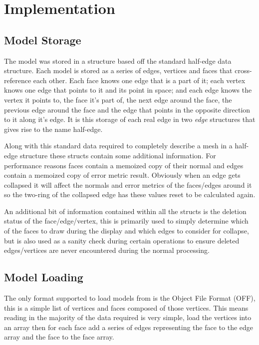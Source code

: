 \chapter{Implementation}

  \vspace{-10pt}
  \section{Model Storage}

    The model was stored in a structure based off the standard half-edge data
    structure.  Each model is stored as a series of edges, vertices and faces
    that cross-reference each other.  Each face knows one edge that is a part of
    it; each vertex knows one edge that points to it and its point in space; and
    each edge knows the vertex it points to, the face it's part of, the next
    edge around the face, the previous edge around the face and the edge that
    points in the opposite direction to it along it's edge.  It is this storage
    of each real edge in two \emph{edge} structures that gives rise to the name
    half-edge.

    Along with this standard data required to completely describe a mesh in a
    half-edge structure these structs contain some additional information.  For
    performance reasons faces contain a memoized copy of their normal and edges
    contain a memoized copy of error metric result.  Obviously when an edge gets
    collapsed it will affect the normals and error metrics of the faces/edges
    around it so the two-ring of the collapsed edge has these values reset to be
    calculated again.

    An additional bit of information contained within all the structs is the
    deletion status of the face/edge/vertex, this is primarily used to simply
    determine which of the faces to draw during the display and which edges to
    consider for collapse, but is also used as a sanity check during certain
    operations to ensure deleted edges/vertices are never encountered during
    the normal processing.

  \vspace{-10pt}
  \section{Model Loading}

    The only format supported to load models from is the Object File Format
    (OFF), this is a simple list of vertices and faces composed of those
    vertices.  This means reading in the majority of the data required is very
    simple, load the vertices into an array then for each face add a series of
    edges representing the face to the edge array and the face to the face
    array.

